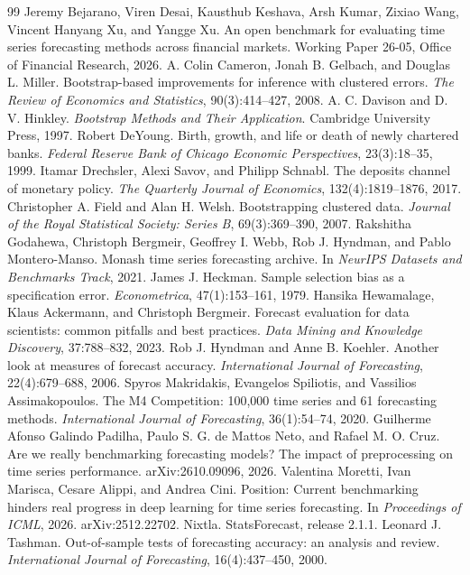 \documentclass[11pt]{article}
\begin{document}
\begin{thebibliography}{99}
 Jeremy Bejarano, Viren Desai, Kausthub Keshava, Arsh Kumar, Zixiao Wang, Vincent Hanyang Xu, and Yangge Xu. An open benchmark for evaluating time series forecasting methods across financial markets. Working Paper 26-05, Office of Financial Research, 2026.
 A. Colin Cameron, Jonah B. Gelbach, and Douglas L. Miller. Bootstrap-based improvements for inference with clustered errors. \emph{The Review of Economics and Statistics}, 90(3):414--427, 2008.
 A. C. Davison and D. V. Hinkley. \emph{Bootstrap Methods and Their Application}. Cambridge University Press, 1997.
 Robert DeYoung. Birth, growth, and life or death of newly chartered banks. \emph{Federal Reserve Bank of Chicago Economic Perspectives}, 23(3):18--35, 1999.
 Itamar Drechsler, Alexi Savov, and Philipp Schnabl. The deposits channel of monetary policy. \emph{The Quarterly Journal of Economics}, 132(4):1819--1876, 2017.
 Christopher A. Field and Alan H. Welsh. Bootstrapping clustered data. \emph{Journal of the Royal Statistical Society: Series B}, 69(3):369--390, 2007.
 Rakshitha Godahewa, Christoph Bergmeir, Geoffrey I. Webb, Rob J. Hyndman, and Pablo Montero-Manso. Monash time series forecasting archive. In \emph{NeurIPS Datasets and Benchmarks Track}, 2021.
 James J. Heckman. Sample selection bias as a specification error. \emph{Econometrica}, 47(1):153--161, 1979.
 Hansika Hewamalage, Klaus Ackermann, and Christoph Bergmeir. Forecast evaluation for data scientists: common pitfalls and best practices. \emph{Data Mining and Knowledge Discovery}, 37:788--832, 2023.
 Rob J. Hyndman and Anne B. Koehler. Another look at measures of forecast accuracy. \emph{International Journal of Forecasting}, 22(4):679--688, 2006.
 Spyros Makridakis, Evangelos Spiliotis, and Vassilios Assimakopoulos. The M4 Competition: 100,000 time series and 61 forecasting methods. \emph{International Journal of Forecasting}, 36(1):54--74, 2020.
 Guilherme Afonso Galindo Padilha, Paulo S. G. de Mattos Neto, and Rafael M. O. Cruz. Are we really benchmarking forecasting models? The impact of preprocessing on time series performance. arXiv:2610.09096, 2026.
 Valentina Moretti, Ivan Marisca, Cesare Alippi, and Andrea Cini. Position: Current benchmarking hinders real progress in deep learning for time series forecasting. In \emph{Proceedings of ICML}, 2026. arXiv:2512.22702.
 Nixtla. StatsForecast, release 2.1.1.
 Leonard J. Tashman. Out-of-sample tests of forecasting accuracy: an analysis and review. \emph{International Journal of Forecasting}, 16(4):437--450, 2000.
\end{thebibliography}
\end{document}
